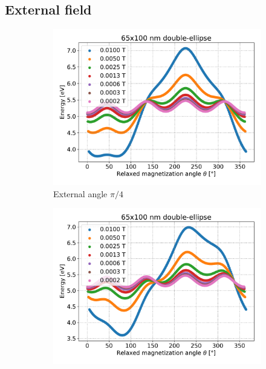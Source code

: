 \documentclass[10pt,a4paper]{article}
\begin{document}
\subsection{External field}
\begin{figure}
     \centering
     \begin{subfigure}[b]{0.65\textwidth}
         \centering
         \includegraphics[width=\textwidth]{Figures/biaxial_island/BarrierLandscape/Ext_K0.1Ms2_Bext1e-2-1e-4_aPi4.pdf}
         \caption{External angle $\pi/4$}
         \label{fig:barrierLandscape-externalAngle-pi4}
     \end{subfigure}
     \hfill
     \begin{subfigure}[b]{0.65\textwidth}
         \centering
         \includegraphics[width=\textwidth]{Figures/biaxial_island/BarrierLandscape/Ext_K0.1Ms2_Bext1e-2-1e-4_a3Pi8.pdf}

\end{subfigure}
\end{figure}
\end{document}
